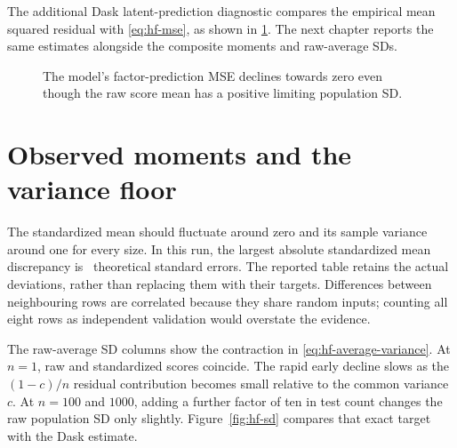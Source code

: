The additional Dask latent-prediction diagnostic compares the empirical
mean squared residual with \eqref{eq:hf-mse}, as shown in
\cref{fig:hf-mse}. The next chapter reports the same estimates alongside
the composite moments and raw-average SDs.

\begin{figure}[htbp]
\centering
{}
\caption{The model's factor-prediction MSE declines towards zero even
though the raw score mean has a positive limiting population SD.}
\label{fig:hf-mse}
\end{figure}

\chapter{Observed moments and the variance floor}
\begingroup\small

\endgroup
The standardized mean should fluctuate around zero and its sample variance
around one for every size. In this run, the largest absolute standardized
mean discrepancy is \SimMaxMeanSE\ theoretical standard errors. The
reported table retains the actual deviations, rather than replacing them
with their targets. Differences between neighbouring rows are correlated
because they share random inputs; counting all eight rows as independent
validation would overstate the evidence.

The raw-average SD columns show the contraction in
\eqref{eq:hf-average-variance}. At \(n=1\), raw and standardized scores
coincide. The rapid early decline slows as the \((1-c)/n\) residual
contribution becomes small relative to the common variance \(c\).
At \(n=100\) and \(1000\), adding a further factor of ten in test count
changes the raw population SD only slightly. Figure~\ref{fig:hf-sd}
compares that exact target with the Dask estimate.

